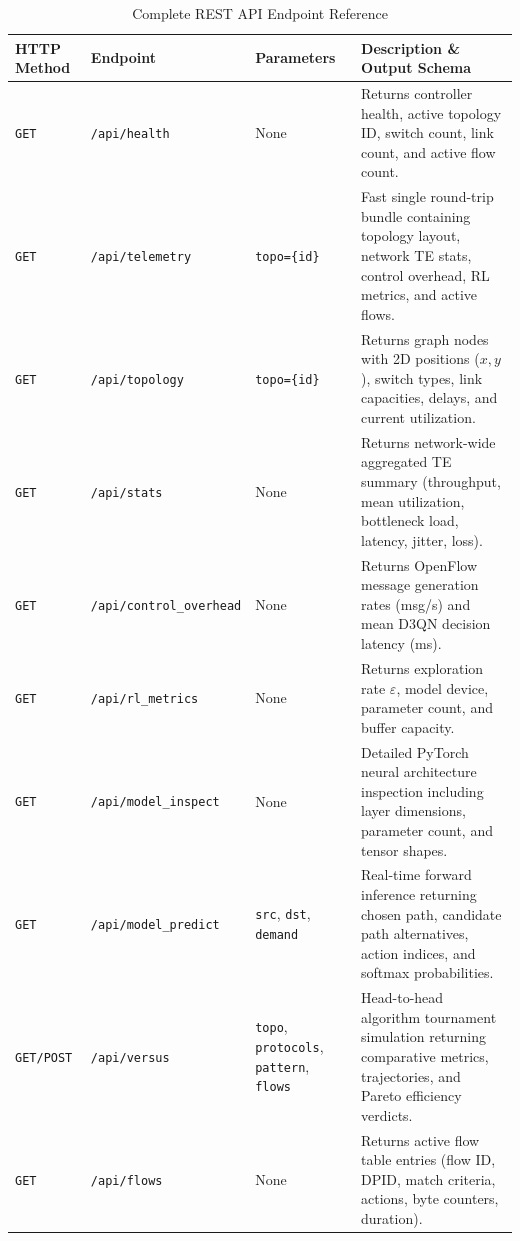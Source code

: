 \begin{table}[htbp]
\centering
\caption{Complete REST API Endpoint Reference}
\label{tab:rest_api_reference}
\small
\begin{tabularx}{\textwidth}{l l p{4.2cm} X}
\toprule
\textbf{HTTP Method} & \textbf{Endpoint} & \textbf{Parameters} & \textbf{Description \& Output Schema} \\
\midrule
\texttt{GET} & \texttt{/api/health} & None & Returns controller health, active topology ID, switch count, link count, and active flow count. \\
\addlinespace
\texttt{GET} & \texttt{/api/telemetry} & \texttt{topo=\{id\}} & Fast single round-trip bundle containing topology layout, network TE stats, control overhead, RL metrics, and active flows. \\
\addlinespace
\texttt{GET} & \texttt{/api/topology} & \texttt{topo=\{id\}} & Returns graph nodes with 2D positions ($x, y$), switch types, link capacities, delays, and current utilization. \\
\addlinespace
\texttt{GET} & \texttt{/api/stats} & None & Returns network-wide aggregated TE summary (throughput, mean utilization, bottleneck load, latency, jitter, loss). \\
\addlinespace
\texttt{GET} & \texttt{/api/control\_overhead} & None & Returns OpenFlow message generation rates (msg/s) and mean D3QN decision latency (ms). \\
\addlinespace
\texttt{GET} & \texttt{/api/rl\_metrics} & None & Returns exploration rate $\varepsilon$, model device, parameter count, and buffer capacity. \\
\addlinespace
\texttt{GET} & \texttt{/api/model\_inspect} & None & Detailed PyTorch neural architecture inspection including layer dimensions, parameter count, and tensor shapes. \\
\addlinespace
\texttt{GET} & \texttt{/api/model\_predict} & \texttt{src}, \texttt{dst}, \texttt{demand} & Real-time forward inference returning chosen path, candidate path alternatives, action indices, and softmax probabilities. \\
\addlinespace
\texttt{GET/POST} & \texttt{/api/versus} & \texttt{topo}, \texttt{protocols}, \texttt{pattern}, \texttt{flows} & Head-to-head algorithm tournament simulation returning comparative metrics, trajectories, and Pareto efficiency verdicts. \\
\addlinespace
\texttt{GET} & \texttt{/api/flows} & None & Returns active flow table entries (flow ID, DPID, match criteria, actions, byte counters, duration). \\

\end{tabularx}
\end{table}
